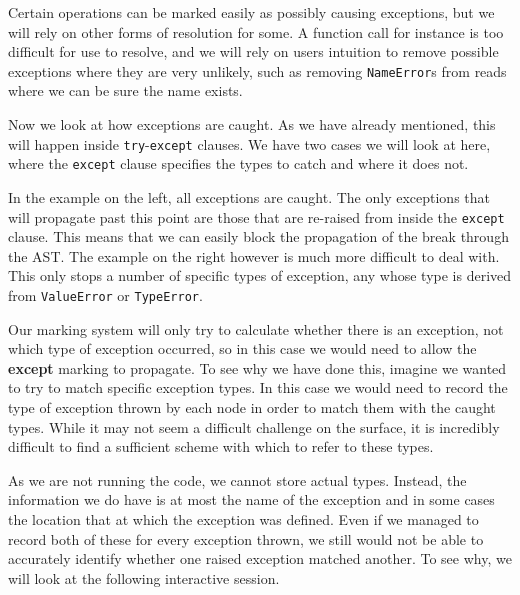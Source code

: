\documentclass[twoside,a4paper]{report}
\begin{document}
Certain operations can be marked easily as possibly causing exceptions, but we will rely on other forms of resolution for some. A function call for instance
is too difficult for use to resolve, and we will rely on users intuition to remove possible exceptions where they are very unlikely, such as removing
\texttt{NameError}s from reads where we can be sure the name exists.

Now we look at how exceptions are caught. As we have already mentioned, this will happen inside \texttt{try}-\texttt{except} clauses. We have two cases we
will look at here, where the \texttt{except} clause specifies the types to catch and where it does not.

\begin{minipage}[b]{0.4\linewidth}
\centering

\end{minipage}
\hspace{1cm}
\begin{minipage}[b]{0.5\linewidth}
\centering

\end{minipage}

In the example on the left, all exceptions are caught. The only exceptions that will propagate past this point are those that are re-raised from inside
the \texttt{except} clause. This means that we can easily block the propagation of the break through the AST. The example on the right however is much more difficult
to deal with. This only stops a number of specific types of exception, any whose type is derived from \texttt{ValueError} or \texttt{TypeError}.

Our marking system will only try to calculate whether there is an exception, not which type of exception occurred, so in this case we would need to allow the
\textbf{except} marking to propagate. To see why we have done this, imagine we wanted to try to match specific exception types. In this case we would need to
record the type of exception thrown by each node in order to match them with the caught types. While it may not seem a difficult challenge on the surface,
it is incredibly difficult to find a sufficient scheme with which to refer to these types.

As we are not running the code, we cannot store actual types. Instead, the information we do have is at most the name of the exception and in some cases
the location that at which the exception was defined. Even if we managed to record both of these for every exception thrown, we still would not be able to
accurately identify whether one raised exception matched another. To see why, we will look at the following interactive session.
\end{document}

